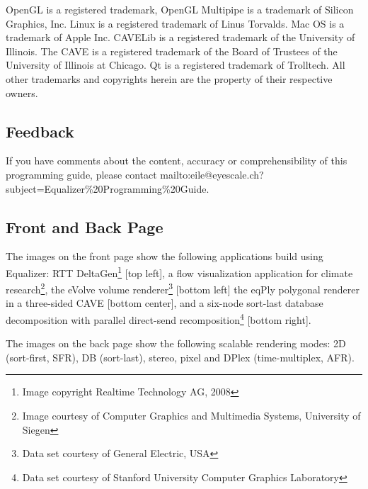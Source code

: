 \documentclass[10pt,a4]{scrartcl}
\begin{document}
OpenGL is a registered trademark, OpenGL Multipipe is a trademark of
Silicon Graphics, Inc. Linux is a registered trademark of Linus
Torvalds.  Mac OS is a trademark of Apple Inc. CAVELib is a registered
trademark of the University of Illinois. The CAVE is a registered
trademark of the Board of Trustees of the University of Illinois at
Chicago. Qt is a registered trademark of Trolltech. All other
trademarks and copyrights herein are the property of their respective
owners.

\subsection*{Feedback}

If you have comments about the content, accuracy or comprehensibility of
this programming guide, please contact
{mailto:eile@eyescale.ch?subject=Equalizer\%20Programming\%20Guide}.

\vfill

\subsection*{Front and Back Page}

The images on the front page show the following applications build using
Equalizer: RTT DeltaGen\footnote{Image copyright Realtime Technology AG,
  2008} [top left], a flow visualization application for climate
research\footnote{Image courtesy of Computer Graphics and Multimedia
  Systems, University of Siegen}, the \textsf{eVolve} volume
renderer\footnote{Data set courtesy of General Electric, USA} [bottom
left] the \textsf{eqPly} polygonal renderer in a three-sided CAVE
[bottom center], and a six-node sort-last database decomposition with
parallel direct-send recomposition\footnote{Data set courtesy of
  Stanford University Computer Graphics Laboratory} [bottom right].

The images on the back page show the following scalable rendering modes:
2D (sort-first, SFR), DB (sort-last), stereo, pixel and DPlex
(time-multiplex, AFR).
\end{document}
